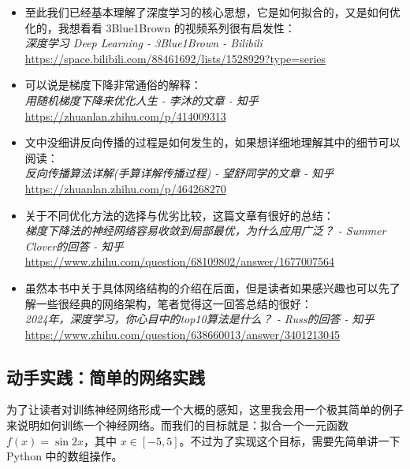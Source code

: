\begin{tcolorbox}[myrecommendbox, title=推荐阅读, breakable=false]
    \begin{itemize}
        \item 至此我们已经基本理解了深度学习的核心思想，它是如何拟合的，又是如何优化的，我想看看 3Blue1Brown 的视频系列很有启发性：\\
              \textit{深度学习 Deep Learning - 3Blue1Brown - Bilibili}\\
              \url{https://space.bilibili.com/88461692/lists/1528929?type=series}
        \item 可以说是梯度下降非常通俗的解释：\\
              \textit{用随机梯度下降来优化人生 - 李沐的文章 - 知乎}\\
              \url{https://zhuanlan.zhihu.com/p/414009313}
        \item 文中没细讲反向传播的过程是如何发生的，如果想详细地理解其中的细节可以阅读：\\
              \textit{反向传播算法详解(手算详解传播过程) - 望舒同学的文章 - 知乎}\\
              \url{https://zhuanlan.zhihu.com/p/464268270}
        \item 关于不同优化方法的选择与优劣比较，这篇文章有很好的总结：\\
              \textit{梯度下降法的神经网络容易收敛到局部最优，为什么应用广泛？ - Summer Clover的回答 - 知乎}\\
              \url{https://www.zhihu.com/question/68109802/answer/1677007564}
        \item 虽然本书中关于具体网络结构的介绍在后面，但是读者如果感兴趣也可以先了解一些很经典的网络架构，笔者觉得这一回答总结的很好：\\
              \textit{2024年，深度学习，你心目中的top10算法是什么？ - Russ的回答 - 知乎}\\
              \url{https://www.zhihu.com/question/638660013/answer/3401213045}
    \end{itemize}
\end{tcolorbox}

\newpage

\subsection*{动手实践：简单的网络实践}

为了让读者对训练神经网络形成一个大概的感知，这里我会用一个极其简单的例子来说明如何训练一个神经网络。而我们的目标就是：拟合一个一元函数 $f(x) = \sin 2x$，其中 $x \in [-5, 5]$。不过为了实现这个目标，需要先简单讲一下 Python 中的数组操作。

